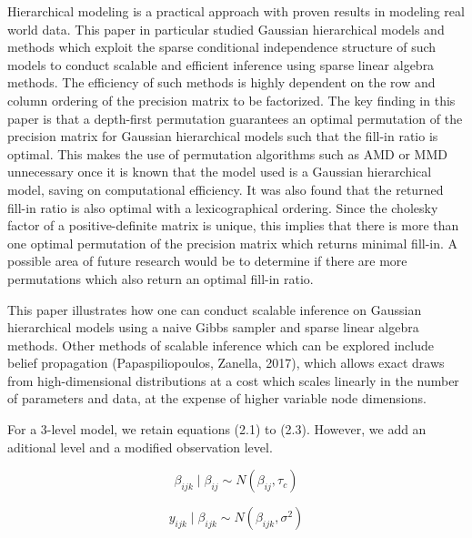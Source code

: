 \documentclass[]{article}
\begin{document}
Hierarchical modeling is a practical approach with proven results in
modeling real world data. This paper in particular studied Gaussian
hierarchical models and methods which exploit the sparse conditional
independence structure of such models to conduct scalable and efficient
inference using sparse linear algebra methods. The efficiency of such
methods is highly dependent on the row and column ordering of the
precision matrix to be factorized. The key finding in this paper is that
a depth-first permutation guarantees an optimal permutation of the
precision matrix for Gaussian hierarchical models such that the fill-in
ratio is optimal. This makes the use of permutation algorithms such as
AMD or MMD unnecessary once it is known that the model used is a
Gaussian hierarchical model, saving on computational efficiency. It was
also found that the returned fill-in ratio is also optimal with a
lexicographical ordering. Since the cholesky factor of a
positive-definite matrix is unique, this implies that there is more than
one optimal permutation of the precision matrix which returns minimal
fill-in. A possible area of future research would be to determine if
there are more permutations which also return an optimal fill-in ratio.

This paper illustrates how one can conduct scalable inference on
Gaussian hierarchical models using a naive Gibbs sampler and sparse
linear algebra methods. Other methods of scalable inference which can be
explored include belief propagation (Papaspiliopoulos, Zanella, 2017),
which allows exact draws from high-dimensional distributions at a cost
which scales linearly in the number of parameters and data, at the
expense of higher variable node dimensions.

\newpage

 \newline \newline \newline
{} \newline 

For a 3-level model, we retain equations (2.1) to (2.3). However, we add
an aditional level and a modified observation level.

\[\beta_{ijk} \;|\; \beta_{ij} \sim N( \beta_{ij}, \tau_c)\]

\[y_{ijk} \;|\; \beta_{ijk} \sim N( \beta_{ijk}, \sigma^2)\]
\newline \newline \newline
\end{document}
